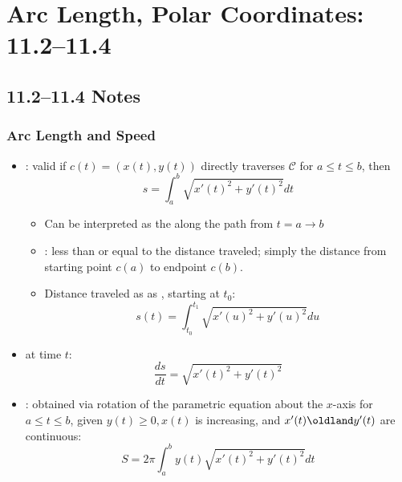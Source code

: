 \chapter{Arc Length, Polar Coordinates: 11.2--11.4}
\section{11.2--11.4 Notes}

\subsection{Arc Length and Speed}
\begin{itemize}
  \item {}: valid if \( c(t) = (x(t), y(t))\)
    directly traverses \(\mathcal{C}\) for \(a \leq t \leq b\), then
    \[%
      s = \int_{a}^{b} \sqrt{x'(t)^2 + y'(t)^2} dt
    \]%
    \begin{itemize}
      \item Can be interpreted as the  along the
        path from \(t = a \to b\)
      \item {}: less than or equal to the distance traveled;
        simply the distance from starting point \(c(a)\) to endpoint \(c(b)\).
      \item Distance traveled as as , starting at \(t_0\):
        \[%
          s(t) = \int_{t_0}^{t_1}  \sqrt{x'(u)^2 + y'(u)^2} du
        \]%
    \end{itemize}

  \item {} at time \(t\):
    \[%
      \frac{ds}{dt} = \sqrt{ x'(t)^2 +y'(t)^2}
    \]%

  \item {}: obtained via rotation of the parametric equation
    about the \(x\)-axis for \(a \leq t \leq b\), given \(y(t) \geq 0, x(t)\)
    is increasing, and \(x'(t) \oldland y'(t)\) are continuous:
    \[%
      S = 2\pi \int_{a}^{b}  y(t) \sqrt{x'(t)^2 + y'(t)^2}  dt
    \]%
\end{itemize}

\newpage %

